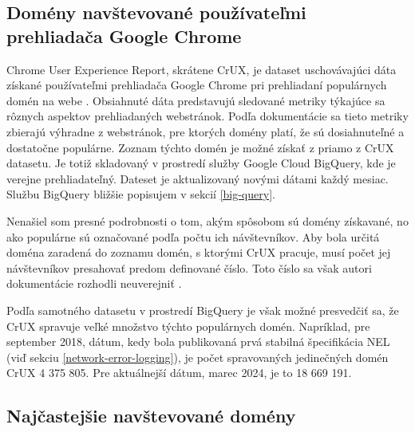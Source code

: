 \subsection{Domény navštevované používateľmi prehliadača Google Chrome}
\label{chrome-user-experience-report}

Chrome User Experience Report, skrátene CrUX, je dataset uschovávajúci dáta získané používateľmi prehliadača Google Chrome pri prehliadaní populárnych domén na webe \cite{chrome-crux}.
Obsiahnuté dáta predstavujú sledované metriky týkajúce sa rôznych aspektov prehliadaných webstránok.
Podľa dokumentácie sa tieto metriky zbierajú výhradne z webstránok, pre ktorých domény platí, že sú dosiahnuteľné a dostatočne populárne.
Zoznam týchto domén je možné získať z priamo z CrUX datasetu.
Je totiž skladovaný v prostredí služby Google Cloud BigQuery, kde je verejne prehliadateľný. 
Dateset je aktualizovaný novými dátami každý mesiac.
Službu BigQuery bližšie popisujem v sekcií \ref{big-query}.

Nenašiel som presné podrobnosti o tom, akým spôsobom sú domény získavané, no ako populárne sú označované podľa počtu ich návštevníkov.
Aby bola určitá doména zaradená do zoznamu domén, s ktorými CrUX pracuje, musí počet jej návštevníkov presahovať predom definované číslo.
Toto číslo sa však autori dokumentácie rozhodli neuverejniť \cite{chrome-crux-methodology}.

Podľa samotného datasetu v prostredí BigQuery je však možné presvedčiť sa, že CrUX spravuje veľké množstvo týchto populárnych domén.
Napríklad, pre september 2018, dátum, kedy bola publikovaná prvá stabilná špecifikácia NEL (viď sekciu \ref{network-error-logging}), je počet spravovaných jedinečných domén CrUX 4 375 805.
Pre aktuálnejší dátum, marec 2024, je to 18 669 191.


\subsection{Najčastejšie navštevované domény}

